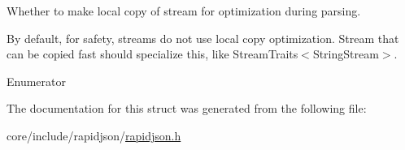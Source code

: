 Whether to make local copy of stream for optimization during parsing. 

By default, for safety, streams do not use local copy optimization. Stream that can be copied fast should specialize this, like Stream\+Traits$<$\+String\+Stream$>$. \begin{Desc}
\item[Enumerator]\par
\begin{description}
\item[{\em 
copy\+Optimization\hypertarget{structStreamTraits_a396e8fd5cbb7c0a9e4c1f509e4d490f5a0300ac4c098b0d59f43a0c4e1ec86eac}{}\label{structStreamTraits_a396e8fd5cbb7c0a9e4c1f509e4d490f5a0300ac4c098b0d59f43a0c4e1ec86eac}
}]\end{description}
\end{Desc}


The documentation for this struct was generated from the following file\+:\begin{DoxyCompactItemize}
\item 
core/include/rapidjson/\hyperlink{rapidjson_8h}{rapidjson.\+h}\end{DoxyCompactItemize}
